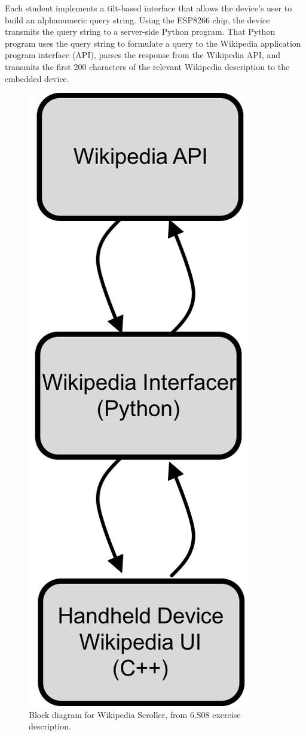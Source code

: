 \documentclass[12pt]{article}
\begin{document}
Each student implements a tilt-based interface that allows the device's user to build an alphanumeric query string.  Using the ESP8266 chip, the device transmits the query string to a server-side Python program.  That Python program uses the query string to formulate a query to the Wikipedia application program interface (API), parses the response from the Wikipedia API, and transmits the first 200 characters of the relevant Wikipedia description to the embedded device.

\begin{figure}[h]
\centering
\includegraphics[scale=0.5]{wiki-block-diagram.png}
\vspace{5mm}
\caption{Block diagram for Wikipedia Scroller, from 6.S08 exercise description.}
\end{figure}
\end{document}

